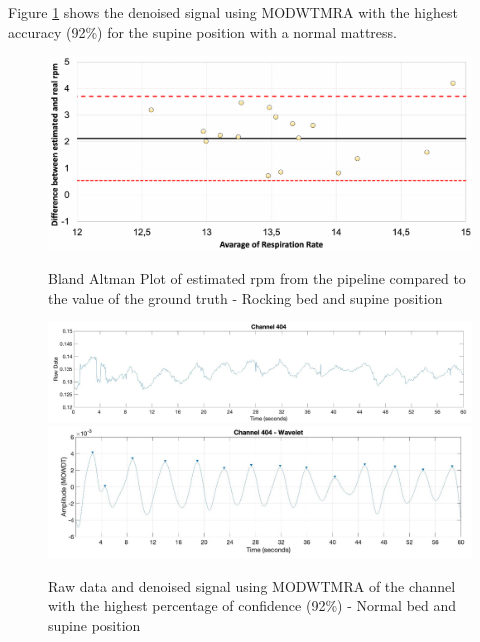 Figure \ref{fig:rec} shows the denoised signal using MODWTMRA with the highest accuracy (92\%) for the supine position with a normal mattress.

\begin{figure}[p]
  \centering
  \includegraphics[width=\textwidth]{img/balnd1.pdf}

  \caption{Bland Altman Plot of estimated rpm from the pipeline compared to the value of the ground truth - Rocking bed and supine position}
  \label{fig:baln1}
  \vspace{1.5cm}
  \includegraphics[width=\textwidth]{img/404.jpg}
  \includegraphics[width=\textwidth]{img/404_wave.jpg}
\caption{Raw data and denoised signal using MODWTMRA of the channel with the highest percentage of confidence (92\%) - Normal bed and supine position}
  \label{fig:rec}
\end{figure}
